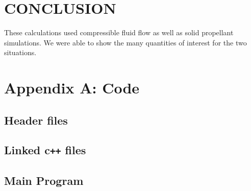 \documentclass[cleanfoot,cleanhead,twocolumn,10pt,notitlepage]{asme2e}
\begin{document}

\section{CONCLUSION}

These calculations used compressible fluid flow as well as solid propellant simulations.  We were able to show the many quantities of interest for the two situations.  



%
%


%

\appendix

\section{Appendix A: Code}
\label{sec:code}
\subsection*{Header files}





\subsection*{Linked c\texttt{++} files}




\subsection*{Main Program}

\end{document}
